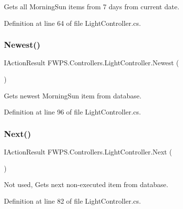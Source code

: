 Gets all Morning\+Sun items from 7 days from current date. 



Definition at line 64 of file Light\+Controller.\+cs.

\mbox{\label{class_f_w_p_s_1_1_controllers_1_1_light_controller_aa3a3e1c2916ef441b88bfb0cf2a525f0}} 
\subsubsection{\texorpdfstring{Newest()}{Newest()}}
{\footnotesize\ttfamily I\+Action\+Result F\+W\+P\+S.\+Controllers.\+Light\+Controller.\+Newest (\begin{DoxyParamCaption}{ }\end{DoxyParamCaption})}



Gets newest Morning\+Sun item from database. 



Definition at line 96 of file Light\+Controller.\+cs.

\mbox{\label{class_f_w_p_s_1_1_controllers_1_1_light_controller_a65788397f941b3dfb336277e6982541a}} 
\subsubsection{\texorpdfstring{Next()}{Next()}}
{\footnotesize\ttfamily I\+Action\+Result F\+W\+P\+S.\+Controllers.\+Light\+Controller.\+Next (\begin{DoxyParamCaption}{ }\end{DoxyParamCaption})}



Not used, Gets next non-\/executed item from database. 



Definition at line 82 of file Light\+Controller.\+cs.

